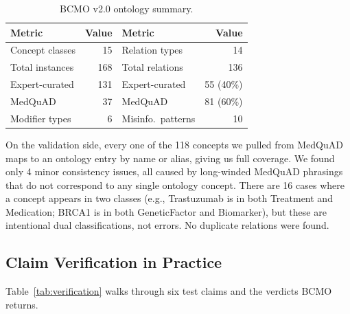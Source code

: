 \documentclass[10pt,a4paper]{article}
\begin{document}
\begin{table}[H]
    \centering
    \caption{BCMO v2.0 ontology summary.}
    \label{tab:summary}
    \vspace{2pt}
    \begin{tabular}{@{}lr@{\hskip 24pt}lr@{}}
        \toprule
        \textbf{Metric} & \textbf{Value} & \textbf{Metric} & \textbf{Value} \\
        \midrule
        Concept classes      & 15          & Relation types       & 14          \\
        Total instances      & 168         & Total relations      & 136         \\
        \quad Expert-curated & 131         & \quad Expert-curated & 55 (40\%)   \\
        \quad MedQuAD        & 37          & \quad MedQuAD        & 81 (60\%)   \\
        Modifier types       & 6           & Misinfo.\ patterns   & 10          \\
        \bottomrule
    \end{tabular}
\end{table}

On the validation side, every one of the 118 concepts we pulled from MedQuAD maps to an ontology entry by name or alias, giving us full coverage. We found only 4 minor consistency issues, all caused by long-winded MedQuAD phrasings that do not correspond to any single ontology concept. There are 16 cases where a concept appears in two classes (e.g., Trastuzumab is in both Treatment and Medication; BRCA1 is in both GeneticFactor and Biomarker), but these are intentional dual classifications, not errors. No duplicate relations were found.

\subsection{Claim Verification in Practice}

Table~\ref{tab:verification} walks through six test claims and the verdicts BCMO returns.
\end{document}
